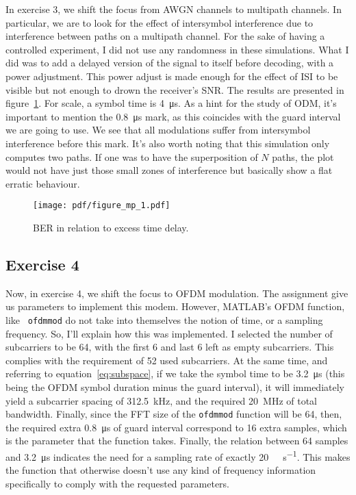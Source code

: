 In exercise 3, we shift the focus from AWGN channels to multipath channels. In
particular, we are to look for the effect of intersymbol interference due to
interference between paths on a multipath channel. For the sake of having a
controlled experiment, I did not use any randomness in these simulations. What I
did was to add a delayed version of the signal to itself before decoding, with a
power adjustment. This power adjust is made enough for the effect of ISI to be
visible but not enough to drown the receiver's SNR\@. The results are presented in
figure~\ref{fig:delaysimp}. For scale, a symbol time is \SI{4}{\micro\second}. As
a hint for the study of ODM, it's important to mention the \SI{0.8}{\micro\second}
mark, as this coincides with the guard interval we are going to use. We see that
all modulations suffer from intersymbol interference before this mark. It's also
worth noting that this simulation only computes two paths. If one was to have the
superposition of \(N\) paths, the plot would not have just those small zones of
interference but basically show a flat erratic behaviour.
\begin{figure}
    \centering
    \texttt{[image: pdf/figure\_mp\_1.pdf]}
    \caption{BER in relation to excess time delay.\label{fig:delaysimp}}
\end{figure}


\subsection{Exercise 4}

Now, in exercise 4, we shift the focus to OFDM modulation. The assignment give us
parameters to implement this modem. However, MATLAB's OFDM function, like {\tt
ofdmmod} do not take into themselves the notion of time, or a sampling frequency.
So, I'll explain how this was implemented. I selected the number of subcarriers to
be 64, with the first 6 and last 6 left as empty subcarriers. This complies with
the requirement of 52 used subcarriers. At the same time, and referring to
equation~\ref{eq:subspace}, if we take the symbol time to be
\SI{3.2}{\micro\second} (this being the OFDM symbol duration minus the guard
interval), it will immediately yield a subcarrier spacing of
\SI{312.5}{\kilo\hertz}, and the required \SI{20}{\mega\hertz} of total bandwidth.
Finally, since the FFT size of the {\tt ofdmmod} function will be 64, then, the
required extra \SI{0.8}{\micro\second} of guard interval correspond to 16 extra
samples, which is the parameter that the function takes. Finally, the relation
between 64 samples and \SI{3.2}{\micro\second} indicates the need for a sampling
rate of exactly \SI{20}{\mega\sample\per\second}. This makes the function that
otherwise doesn't use any kind of frequency information specifically to comply
with the requested parameters.

